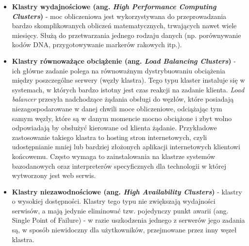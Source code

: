 \documentclass[10pt,a4paper,titlepage,twoside]{report}
\begin{document}
\begin{itemize}
	\item \textbf{Klastry wydajnościowe (ang. \textit{High Performance Computing Clusters})} - moc obliczeniowa jest wykorzystywana do przeprowadzania bardzo skomplikowanych obliczeń matematycznych, trwających nawet wiele miesięcy. Służą do przetwarzania jednego rodzaju danych (np. porównywanie kodów DNA, przygotowywanie markerów rakowych itp.).
	\item \textbf{Klastry równoważące obciążenie (ang. \textit{Load Balancing Clusters})} - ich główne zadanie polega na równoważnym dystrybuowaniu obciążenia między poszczególne serwery  (węzły klastra). Tego typu klaster instaluje się w systemach, w których bardzo istotny jest czas reakcji na zadanie klienta. \textit{Load balancer} przesyła nadchodzące żądania obsługi do węzłów, które posiadają niezagospodarowane w danej chwili moce obliczeniowe, odciążając tym samym węzły, które są w danym momencie mocno obciążone i zbyt wolno odpowiadają by obsłużyć kierowane od klienta żądanie. Przykładowe zastosowanie takiego klastra to hosting stron internetowych, czyli udostępnianie mniej lub bardziej złożonych aplikacji internetowych klientowi końcowemu. Często wymaga to zainstalowania na klastrze systemów bazodanowych oraz interpreterów specyficznych dla technologii w której wytworzony jest web serwis.
	\item \textbf{Klastry niezawodnościowe (ang. \textit{High Availability Clusters})} - klastry o wysokiej dostępności. Klastry tego typu nie zwiększają wydajności serwisów, a mają jedynie eliminować tzw. pojedynczy punkt awarii (ang. Single Point of Failure) - w razie uszkodzenia jednego z serwerów jego zadania są, w sposób niewidoczny dla użytkowników, przejmowane przez inny węzeł klastra.
\end{itemize}
\end{document}
